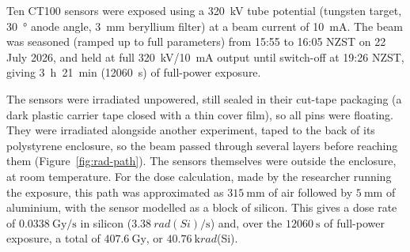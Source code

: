 \documentclass[12pt,a4paper]{article}
\begin{document}
Ten CT100 sensors were exposed using a \SI{320}{\kilo\volt} tube potential (tungsten target, \SI{30}{\degree} anode angle, \SI{3}{\milli\metre} beryllium filter) at a beam current of \SI{10}{\milli\ampere}. The beam was seasoned (ramped up to full parameters) from 15:55 to 16:05 NZST on 22 July 2026, and held at full \SI{320}{\kilo\volt}/\SI{10}{\milli\ampere} output until switch-off at 19:26 NZST, giving \SI{3}{\hour}~\SI{21}{\minute} (\SI{12060}{\second}) of full-power exposure.

The sensors were irradiated unpowered, still sealed in their cut-tape packaging (a dark plastic carrier tape closed with a thin cover film), so all pins were floating. They were irradiated alongside another experiment, taped to the back of its polystyrene enclosure, so the beam passed through several layers before reaching them (Figure~\ref{fig:rad-path}). The sensors themselves were outside the enclosure, at room temperature. For the dose calculation, made by the researcher running the exposure, this path was approximated as $\SI{315}{\milli\metre}$ of air followed by $\SI{5}{\milli\metre}$ of aluminium, with the sensor modelled as a block of silicon. This gives a dose rate of $\SI{0.0338}{\gray\per\second}$ in silicon ($\SI{3.38}{rad(Si)\per\second}$) and, over the $\SI{12060}{\second}$ of full-power exposure, a total of $\SI{407.6}{\gray}$, or $\SI{40.76}{\kilo rad}$(Si).
\end{document}

